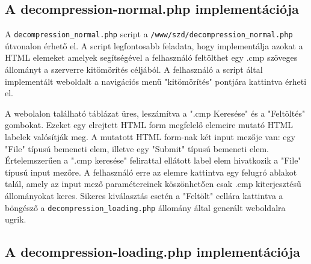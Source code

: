 \documentclass[oneside,titlepage,12pt,a4paper]{report}
\begin{document}
\subsection{A decompression-normal.php implementációja}

A \texttt{decompression\_normal.php} script a \texttt{/www/szd/decompression\_normal.php} útvonalon érhető el. A script legfontosabb feladata, hogy implementálja azokat a HTML elemeket amelyek segítségével a felhasználó feltölthet egy .cmp szöveges állományt a szerverre kitömörítés céljából. A felhasználó a script által implementált weboldalt a navigációs menü "kitömörítés" pontjára kattintva érheti el. 
\par A webolalon található táblázat üres, leszámítva a ".cmp Keresése" és a "Feltöltés" gombokat. Ezeket egy elrejtett HTML form megfelelő elemeire mutató HTML labelek valósítják meg. A mutatott HTML form-nak két input mezője van: egy "File" típusú bemeneti elem, illetve egy "Submit" típusú bemeneti elem. Értelemszerűen a ".cmp keresése" felirattal ellátott label elem hivatkozik a "File" típusú input mezőre. A felhasználó erre az elemre kattintva egy felugró ablakot talál, amely az input mező paramétereinek köszönhetően csak .cmp kiterjesztésű állományokat keres. Sikeres kiválasztás esetén a "Feltölt" cellára kattintva a böngésző a \texttt{decompression\_loading.php} állomány által generált weboldalra ugrik. 

\subsection{A decompression-loading.php implementációja}
\end{document}
